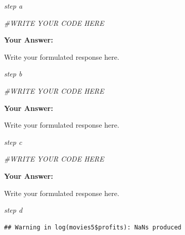 \documentclass[
]{article}
\newenvironment{Shaded}{\begin{snugshade}}{\end{snugshade}}
\newcommand{\CommentTok}[1]{\textcolor[rgb]{0.56,0.35,0.01}{\textit{#1}}}
\newcommand{\FunctionTok}[1]{\textcolor[rgb]{0.13,0.29,0.53}{\textbf{#1}}}
\newcommand{\NormalTok}[1]{#1}
\newcommand{\OtherTok}[1]{\textcolor[rgb]{0.56,0.35,0.01}{#1}}
\newcommand{\SpecialCharTok}[1]{\textcolor[rgb]{0.81,0.36,0.00}{\textbf{#1}}}
\begin{document}
\emph{step a}

\begin{Shaded}
\begin{Highlighting}[]
\CommentTok{\#WRITE YOUR CODE HERE}
\end{Highlighting}
\end{Shaded}

\textbf{Your Answer:}

Write your formulated response here.

\emph{step b}

\begin{Shaded}
\begin{Highlighting}[]
\CommentTok{\#WRITE YOUR CODE HERE}
\end{Highlighting}
\end{Shaded}

\textbf{Your Answer:}

Write your formulated response here.

\emph{step c}

\begin{Shaded}
\begin{Highlighting}[]
\CommentTok{\#WRITE YOUR CODE HERE}
\end{Highlighting}
\end{Shaded}

\textbf{Your Answer:}

Write your formulated response here.

\emph{step d}

\begin{Shaded}
\end{Shaded}

\begin{verbatim}
## Warning in log(movies5$profits): NaNs produced
\end{verbatim}
\end{document}
